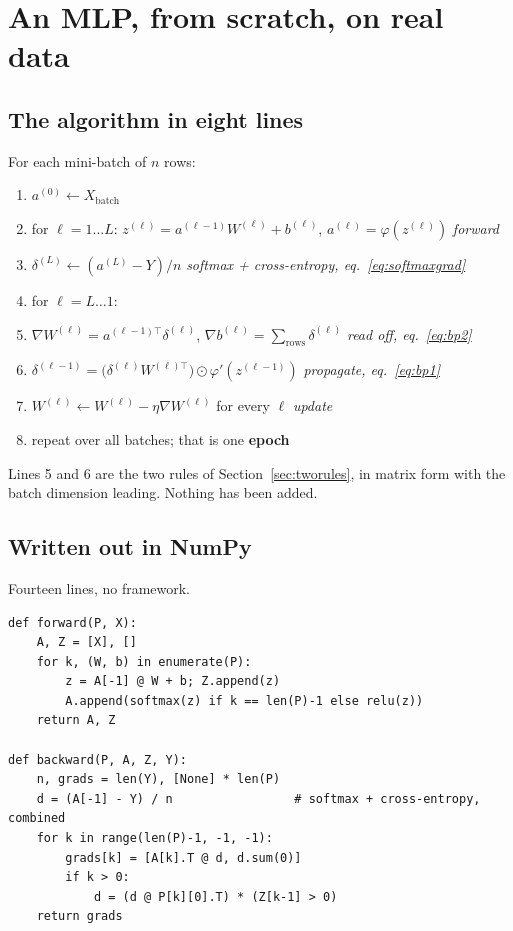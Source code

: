 \documentclass[11pt]{article}
\begin{document}
\section{An MLP, from scratch, on real data}
\label{sec:mlp}

\subsection{The algorithm in eight lines}

For each mini-batch of $n$ rows:

\begin{enumerate}[leftmargin=*]
  \item $a^{(0)} \leftarrow X_{\text{batch}}$
  \item for $\ell = 1 \dots L$: \;
    $z^{(\ell)} = a^{(\ell-1)}W^{(\ell)} + b^{(\ell)}$, \;
    $a^{(\ell)} = \varphi(z^{(\ell)})$ \hfill \emph{forward}
  \item $\delta^{(L)} \leftarrow (a^{(L)} - Y)/n$
    \hfill \emph{softmax + cross-entropy, eq.~\eqref{eq:softmaxgrad}}
  \item for $\ell = L \dots 1$:
  \item \quad $\nabla W^{(\ell)} = a^{(\ell-1)\top}\delta^{(\ell)}$, \;
    $\nabla b^{(\ell)} = \sum_{\text{rows}} \delta^{(\ell)}$
    \hfill \emph{read off, eq.~\eqref{eq:bp2}}
  \item \quad $\delta^{(\ell-1)} =
    \big(\delta^{(\ell)}W^{(\ell)\top}\big)\odot\varphi'(z^{(\ell-1)})$
    \hfill \emph{propagate, eq.~\eqref{eq:bp1}}
  \item $W^{(\ell)} \leftarrow W^{(\ell)} - \eta\nabla W^{(\ell)}$ for every
    $\ell$ \hfill \emph{update}
  \item repeat over all batches; that is one \textbf{epoch}
\end{enumerate}

Lines 5 and 6 are the two rules of Section~\ref{sec:tworules}, in matrix form
with the batch dimension leading. Nothing has been added.

\subsection{Written out in NumPy}
\label{sec:mlpcode}

Fourteen lines, no framework.

\begin{lstlisting}
def forward(P, X):
    A, Z = [X], []
    for k, (W, b) in enumerate(P):
        z = A[-1] @ W + b; Z.append(z)
        A.append(softmax(z) if k == len(P)-1 else relu(z))
    return A, Z

def backward(P, A, Z, Y):
    n, grads = len(Y), [None] * len(P)
    d = (A[-1] - Y) / n                 # softmax + cross-entropy, combined
    for k in range(len(P)-1, -1, -1):
        grads[k] = [A[k].T @ d, d.sum(0)]
        if k > 0:
            d = (d @ P[k][0].T) * (Z[k-1] > 0)
    return grads
\end{lstlisting}
\end{document}
